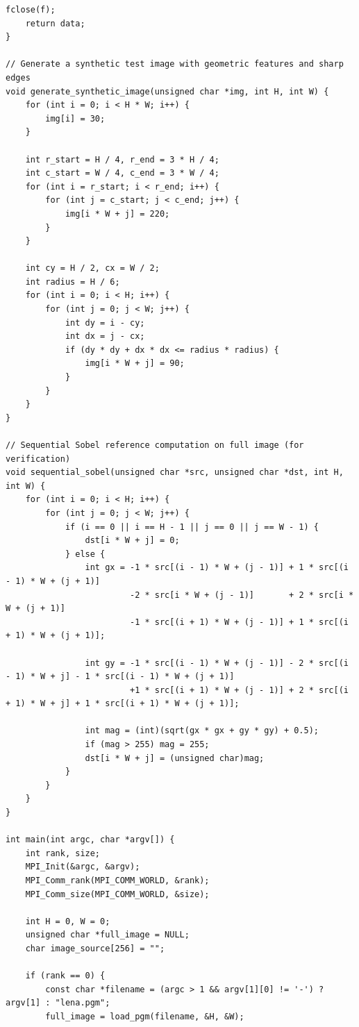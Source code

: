 \documentclass[12pt]{article}
\begin{document}
\begin{lstlisting}[style=code]
    fclose(f);
    return data;
}

// Generate a synthetic test image with geometric features and sharp edges
void generate_synthetic_image(unsigned char *img, int H, int W) {
    for (int i = 0; i < H * W; i++) {
        img[i] = 30;
    }

    int r_start = H / 4, r_end = 3 * H / 4;
    int c_start = W / 4, c_end = 3 * W / 4;
    for (int i = r_start; i < r_end; i++) {
        for (int j = c_start; j < c_end; j++) {
            img[i * W + j] = 220;
        }
    }

    int cy = H / 2, cx = W / 2;
    int radius = H / 6;
    for (int i = 0; i < H; i++) {
        for (int j = 0; j < W; j++) {
            int dy = i - cy;
            int dx = j - cx;
            if (dy * dy + dx * dx <= radius * radius) {
                img[i * W + j] = 90;
            }
        }
    }
}

// Sequential Sobel reference computation on full image (for verification)
void sequential_sobel(unsigned char *src, unsigned char *dst, int H, int W) {
    for (int i = 0; i < H; i++) {
        for (int j = 0; j < W; j++) {
            if (i == 0 || i == H - 1 || j == 0 || j == W - 1) {
                dst[i * W + j] = 0;
            } else {
                int gx = -1 * src[(i - 1) * W + (j - 1)] + 1 * src[(i - 1) * W + (j + 1)]
                         -2 * src[i * W + (j - 1)]       + 2 * src[i * W + (j + 1)]
                         -1 * src[(i + 1) * W + (j - 1)] + 1 * src[(i + 1) * W + (j + 1)];

                int gy = -1 * src[(i - 1) * W + (j - 1)] - 2 * src[(i - 1) * W + j] - 1 * src[(i - 1) * W + (j + 1)]
                         +1 * src[(i + 1) * W + (j - 1)] + 2 * src[(i + 1) * W + j] + 1 * src[(i + 1) * W + (j + 1)];

                int mag = (int)(sqrt(gx * gx + gy * gy) + 0.5);
                if (mag > 255) mag = 255;
                dst[i * W + j] = (unsigned char)mag;
            }
        }
    }
}

int main(int argc, char *argv[]) {
    int rank, size;
    MPI_Init(&argc, &argv);
    MPI_Comm_rank(MPI_COMM_WORLD, &rank);
    MPI_Comm_size(MPI_COMM_WORLD, &size);

    int H = 0, W = 0;
    unsigned char *full_image = NULL;
    char image_source[256] = "";

    if (rank == 0) {
        const char *filename = (argc > 1 && argv[1][0] != '-') ? argv[1] : "lena.pgm";
        full_image = load_pgm(filename, &H, &W);


\end{lstlisting}
\end{document}
